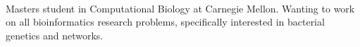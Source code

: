 \begin{cvparagraph}\\
Masters student in Computational Biology at Carnegie Mellon.
Wanting to work on all bioinformatics research problems, specifically interested in bacterial genetics and networks.
\end{cvparagraph}

